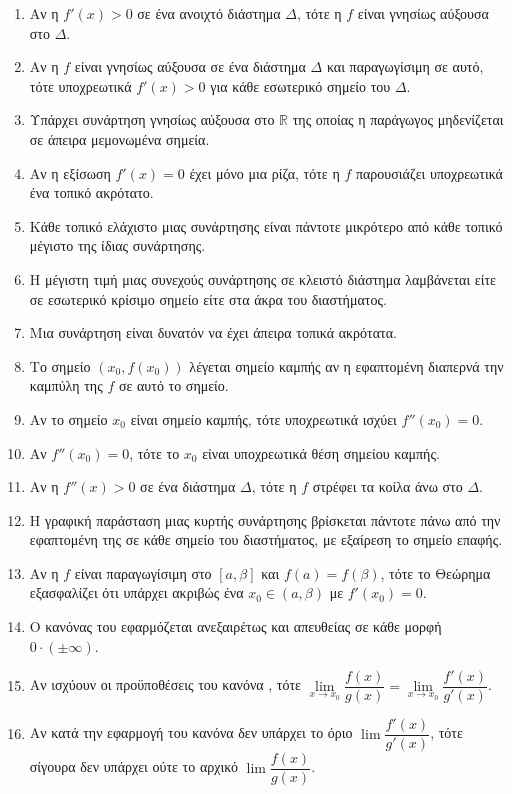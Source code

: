 \begin{enumerate}[label=\textbf{2.\arabic*.}]
    \item Αν η $f'(x) > 0$ σε ένα ανοιχτό διάστημα $\Delta$, τότε η $f$ είναι γνησίως αύξουσα στο $\Delta$.
    \item Αν η $f$ είναι γνησίως αύξουσα σε ένα διάστημα $\Delta$ και παραγωγίσιμη σε αυτό, τότε υποχρεωτικά $f'(x) > 0$ για κάθε εσωτερικό σημείο του $\Delta$.
    \item Υπάρχει συνάρτηση γνησίως αύξουσα στο $\mathbb{R}$ της οποίας η παράγωγος μηδενίζεται σε άπειρα μεμονωμένα σημεία.
    \item Αν η εξίσωση $f'(x) = 0$ έχει μόνο μια ρίζα, τότε η $f$ παρουσιάζει υποχρεωτικά ένα τοπικό ακρότατο.
    \item Κάθε τοπικό ελάχιστο μιας συνάρτησης είναι πάντοτε μικρότερο από κάθε τοπικό μέγιστο της ίδιας συνάρτησης.
    \item Η μέγιστη τιμή μιας συνεχούς συνάρτησης σε κλειστό διάστημα λαμβάνεται είτε σε εσωτερικό κρίσιμο σημείο είτε στα άκρα του διαστήματος.
    \item Μια συνάρτηση είναι δυνατόν να έχει άπειρα τοπικά ακρότατα.
    \item Το σημείο $(x_0, f(x_0))$ λέγεται σημείο καμπής αν η εφαπτομένη διαπερνά την καμπύλη της $f$ σε αυτό το σημείο.
    \item Αν το σημείο $x_0$ είναι σημείο καμπής, τότε υποχρεωτικά ισχύει $f''(x_0) = 0$.
    \item Αν $f''(x_0) = 0$, τότε το $x_0$ είναι υποχρεωτικά θέση σημείου καμπής.
    \item Αν η $f''(x) > 0$ σε ένα διάστημα $\Delta$, τότε η $f$ στρέφει τα κοίλα άνω στο $\Delta$.
    \item Η γραφική παράσταση μιας κυρτής συνάρτησης βρίσκεται πάντοτε πάνω από την εφαπτομένη της σε κάθε σημείο του διαστήματος, με εξαίρεση το σημείο επαφής.
    \item Αν η $f$ είναι παραγωγίσιμη στο $[a, \beta]$ και $f(a) = f(\beta)$, τότε το Θεώρημα  εξασφαλίζει ότι υπάρχει ακριβώς ένα $x_0 \in (a, \beta)$ με $f'(x_0) = 0$.
    \item Ο κανόνας του  εφαρμόζεται ανεξαιρέτως και απευθείας σε κάθε μορφή $0 \cdot (\pm \infty)$.
    \item Αν ισχύουν οι προϋποθέσεις του κανόνα , τότε $\lim\limits_{x \to x_0} \dfrac{f(x)}{g(x)} = \lim\limits_{x \to x_0} \dfrac{f'(x)}{g'(x)}$.
    \item Αν κατά την εφαρμογή του κανόνα  δεν υπάρχει το όριο $\lim \dfrac{f'(x)}{g'(x)}$, τότε σίγουρα δεν υπάρχει ούτε το αρχικό $\lim \dfrac{f(x)}{g(x)}$.

\end{enumerate}

